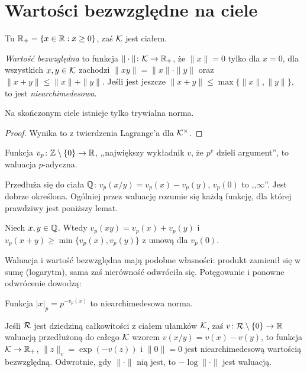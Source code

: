 \section{Wartości bezwzględne na ciele}
Tu $\mathbb R_+ = \{x \in \mathbb R : x \ge 0\}$, zaś $\mathcal K$ jest ciałem.

\begin{definicja}
	\emph{Wartość bezwzględna} to funkcja $\|\cdot\| \colon \mathcal K \to \mathbb R_+$, że $\|x\| = 0$ tylko dla $x = 0$, dla wszystkich $x, y \in \mathcal K $ zachodzi $\|xy\| = \|x\| \cdot \|y\|$ oraz $\|x + y\| \le \|x\| + \|y\|$.
	Jeśli jest jeszcze $\|x+y\| \le \max \{\|x\|, \|y\|\}$, to jest \emph{niearchimedesowa}.
\end{definicja}

\begin{fakt}
	Na skończonym ciele istnieje tylko trywialna norma.
\end{fakt}

\begin{proof}
	Wynika to z twierdzenia Lagrange'a dla $\mathcal K^\times$.
\end{proof}

\begin{definicja}
	Funkcja $v_p \colon \mathbb Z \setminus \{0\} \to \mathbb R$, ,,największy wykładnik $v$, że $p^v$ dzieli argument'', to waluacja $p$-adyczna.
\end{definicja}

Przedłuża się do ciała $\mathbb Q$: $v_p(x/y) = v_p(x) - v_p(y)$, $v_p(0)$ to ,,$\infty$''.
Jest dobrze określona.
Ogólniej przez waluację rozumie się każdą funkcję, dla której prawdziwy jest poniższy lemat.

\begin{lemat}
	Niech $x, y \in \mathbb Q$.
	Wtedy $v_p(xy) = v_p(x) + v_p(y)$ i $v_p(x+y) \ge \min \{v_p(x), v_p(y)\}$ z umową dla $v_p(0)$.
\end{lemat}

Waluacja i wartość bezwzględna mają podobne własności: produkt zamienił się w sumę (logarytm), sama zaś nierówność odwróciła się.
Potęgowanie i ponowne odwrócenie dowodzą:

\begin{fakt}
	Funkcja $|x|_p = p^{-v_p(x)}$ to niearchimedesowa norma.
\end{fakt}

\begin{fakt}
	Jeśli $\mathcal R$ jest dziedziną całkowitości z ciałem ułamków $\mathcal K$, zaś $v \colon \mathcal R \setminus \{0\} \to \mathbb R$ waluacją przedłużoną do całego $\mathcal K$ wzorem $v(x/y) = v(x)-v(y)$, to funkcja $\mathcal K \to \mathbb R_+$, $\|z\|_v = \exp(-v(z))$ i $\|0\| = 0$ jest niearchimedesową wartością bezwzględną.
	Odwrotnie, gdy $\|\cdot\|$ nią jest, to $-\log \|\cdot\|$ jest waluacją.
\end{fakt}

